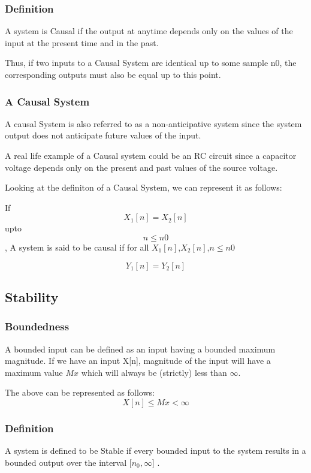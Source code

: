 \subsubsection{Definition}
A system is Causal if the output at anytime depends only on the values of the input at the present time and in the past. 

Thus, if two inputs to a Causal System are identical up to some sample n0, the corresponding outputs must also be equal up to this point.

\subsubsection{A Causal System}
A causal System is also referred to as a non-anticipative system since the system output does not anticipate future values of the input. 

A real life example of a Causal system could be an RC circuit since a capacitor voltage depends only on the present and past values of the source voltage.

Looking at the definiton of a Causal System, we can represent it as follows:

If $$ X_1[n]=X_2[n]$$
upto $$n \leq n0$$,
A system is said to be causal if for all $X_1[n]$,$X_2[n]$,$n \leq n0$

$$ Y_1[n]=Y_2[n]$$



\subsection{Stability}

\subsubsection{Boundedness}
A bounded input can be defined as an input having a bounded maximum magnitude. If we have an input X[n], magnitude of the input will have a maximum value $Mx$ which will always be (strictly) less than $\infty$. 

The above can be represented as follows:
$$ X[n] \leq Mx < \infty$$


\subsubsection{Definition}
A system is defined to be Stable if every bounded input to the system results in a bounded output over the interval [$ n_0,\infty $] . 

